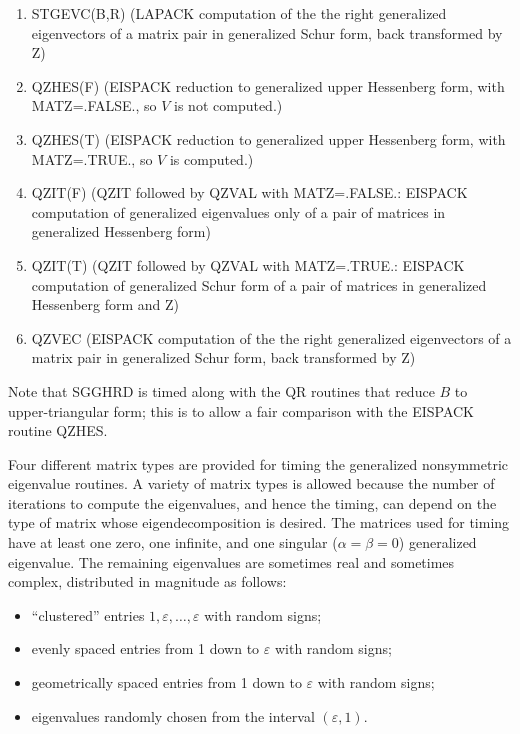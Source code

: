 \begin{enumerate}
\item STGEVC(B,R) (LAPACK computation of the the right generalized
              eigenvectors of a matrix pair in generalized Schur form, back
              transformed by Z)
\item QZHES(F) (EISPACK reduction to generalized upper Hessenberg form,
                with MATZ\hz=\hz.FALSE., so $V$ is not computed.)
\item QZHES(T) (EISPACK reduction to generalized upper Hessenberg form,
                with MATZ\hz=\hz.TRUE., so $V$ is computed.)
\item QZIT(F) (QZIT followed by QZVAL with MATZ\hz=\hz.FALSE.:
              EISPACK computation of
              generalized eigenvalues only of
              a pair of matrices in generalized Hessenberg form)
\item QZIT(T) (QZIT followed by QZVAL with MATZ\hz=\hz.TRUE.:
              EISPACK computation of
              generalized Schur form of
              a pair of matrices in generalized Hessenberg form and Z)
\item QZVEC    (EISPACK computation of the the right generalized
              eigenvectors of a matrix pair in generalized Schur form, back
              transformed by Z)
\end{enumerate}
Note that SGGHRD is timed along with the QR routines
that reduce $B$ to upper-triangular form;
this is to allow a fair comparison with the EISPACK routine QZHES.

Four different matrix types are provided for
timing the generalized nonsymmetric eigenvalue routines.
A variety of matrix types is allowed because the number of iterations
to compute the eigenvalues, and hence the timing, can depend on the
type of matrix whose eigendecomposition is desired.
The matrices used for timing have at least one zero, one infinite,
and one singular ($\alpha=\beta=0$) generalized eigenvalue.
The remaining eigenvalues are sometimes real and sometimes complex,
distributed in magnitude as follows:
\begin{itemize}
\item ``clustered'' entries $1, \varepsilon , \ldots, \varepsilon$  with random
signs;
\item evenly spaced entries from 1 down to $\varepsilon$ with random signs;
\item geometrically  spaced entries from 1 down to $\varepsilon$ with random 
signs;
\item eigenvalues randomly chosen from
the interval $( \varepsilon , 1 )$.
\end{itemize}

